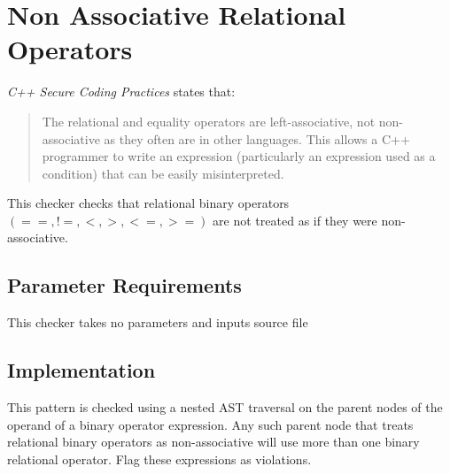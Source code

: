 %
%

\section{Non Associative Relational Operators}
\label{NonAssociativeRelationalOperators::overview}
{\it C++ Secure Coding Practices} states that:
\begin{quote}
The relational and equality operators are left-associative, not non-associative as they often are in other languages. This allows a C++ programmer to write an expression (particularly an expression used as a condition) that can be easily misinterpreted.
\end{quote}
This checker checks that relational binary operators $(==,!=,<,>,<=,>=)$ are not treated as if they were non-associative.

\subsection{Parameter Requirements}
This checker takes no parameters and inputs source file

\subsection{Implementation}
This pattern is checked using a nested AST traversal on the parent nodes of the operand of a binary operator expression. Any such parent node that treats relational binary operators as non-associative will use more than one binary relational operator. Flag these expressions as violations.

